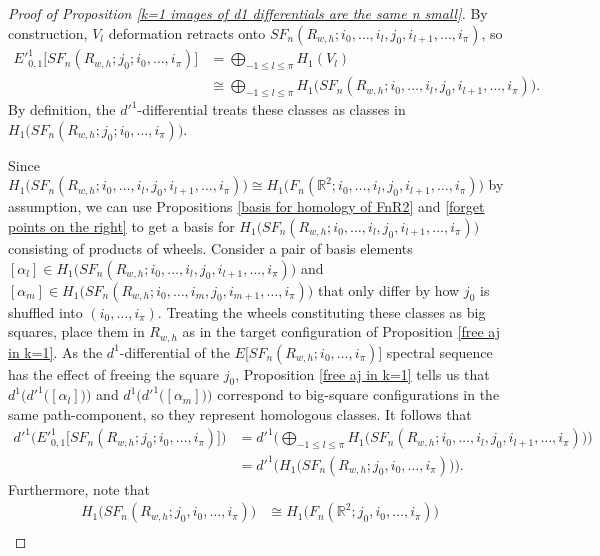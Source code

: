 \documentclass[pagebackref,colorlinks,citecolor=blue,linkcolor=blue,urlcolor=blue,filecolor=blue]{article}
\theoremstyle{definition}\newtheorem{definition}[thm]{Definition}
\theoremstyle{definition}
\newcommand{\R}{\ensuremath{\mathbb{R}}}
\begin{document}
\begin{proof}[Proof of Proposition \ref{k=1 images of d1 differentials are the same n small}]
By construction, $V_{l}$ deformation retracts onto $SF_{n}(R_{w, h}; i_{0}, \dots, i_{l}, j_{0}, i_{l+1},\dots, i_{\pi})$, so
\begin{align*}
E'^{1}_{0,1}\big[SF_{n}(R_{w, h}; j_{0}; i_{0}, \dots, i_{\pi})\big]&=\bigoplus_{-1\le l\le \pi}H_{1}(V_{l})\\&\cong\bigoplus_{-1\le l\le \pi}H_{1}\big(SF_{n}(R_{w, h}; i_{0}, \dots, i_{l}, j_{0}, i_{l+1},\dots, i_{\pi})\big).
\end{align*}
By definition, the $d'^{1}$-differential treats these classes as classes in $H_{1}\big(SF_{n}(R_{w, h}; j_{0}; i_{0}, \dots, i_{\pi})\big)$.


Since $H_{1}\big(SF_{n}(R_{w, h}; i_{0}, \dots, i_{l}, j_{0}, i_{l+1},\dots, i_{\pi})\big)\cong H_{1}\big(F_{n}(\R^{2}; i_{0}, \dots, i_{l}, j_{0}, i_{l+1},\dots, i_{\pi})\big)$ by assumption, we can use Propositions \ref{basis for homology of FnR2} and \ref{forget points on the right} to get a basis for $H_{1}\big(SF_{n}(R_{w, h}; i_{0}, \dots, i_{l}, j_{0}, i_{l+1},\dots, i_{\pi})\big)$ consisting of products of wheels.
Consider a pair of basis elements $[\alpha_{l}]\in H_{1}\big(SF_{n}(R_{w, h}; i_{0}, \dots, i_{l}, j_{0}, i_{l+1},\dots, i_{\pi})\big)$ and $[\alpha_{m}]\in H_{1}\big(SF_{n}(R_{w, h}; i_{0}, \dots, i_{m}, j_{0}, i_{m+1},\dots, i_{\pi})\big)$ that only differ by how $j_{0}$ is shuffled into $(i_{0}, \dots, i_{\pi})$.
Treating the wheels constituting these classes as big squares, place them in $R_{w,h}$ as in the target configuration of Proposition \ref{free aj in k=1}.
As the $d^{1}$-differential of the $E\big[SF_{n}(R_{w,h}; i_{0}, \dots, i_{\pi})\big]$ spectral sequence has the effect of freeing the square $j_{0}$, Proposition \ref{free aj in k=1} tells us that $d^{1}\Big(d'^{1}\big([\alpha_{l}]\big)\Big)$ and $d^{1}\Big(d'^{1}\big([\alpha_{m}]\big)\Big)$ correspond to big-square configurations in the same path-component, so they represent homologous classes.  
It follows that
\begin{align*}
d'^{1}\Big(E'^{1}_{0,1}\big[SF_{n}(R_{w, h}; j_{0}; i_{0}, \dots, i_{\pi})\big]\Big)&=d'^{1}\Big(\bigoplus_{-1\le l\le \pi}H_{1}\big(SF_{n}(R_{w, h}; i_{0}, \dots, i_{l}, j_{0}, i_{l+1},\dots, i_{\pi})\big)\Big)\\
&=d'^{1}\Big(H_{1}\big(SF_{n}(R_{w, h}; j_{0}, i_{0}, \dots, i_{\pi})\big)\Big).
\end{align*}
Furthermore, note that 
\begin{align*}
H_{1}\big(SF_{n}(R_{w, h}; j_{0}, i_{0}, \dots, i_{\pi})\big)&\cong H_{1}\big(F_{n}(\R^{2}; j_{0}, i_{0}, \dots, i_{\pi})\big)\\

\end{align*}
\end{proof}
\end{document}

